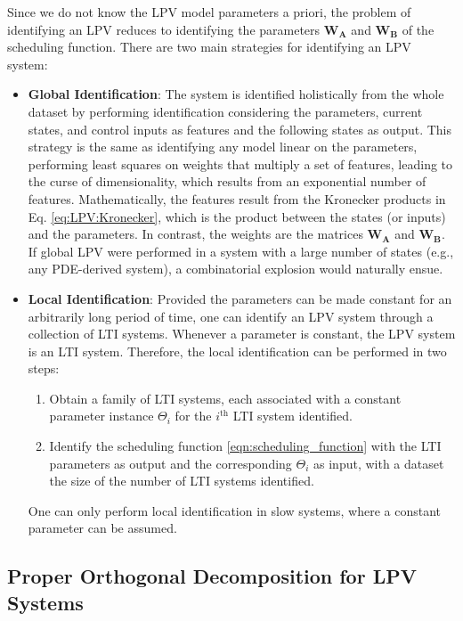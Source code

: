 Since we do not know the LPV model parameters a priori, the problem of identifying an LPV reduces to identifying the parameters $\mathbf{W_A}$ and $\mathbf{W_B}$ of the scheduling function.
%
There are two main strategies for identifying an LPV system:
\begin{itemize}
    \item \textbf{Global Identification}: The system is identified holistically from the whole dataset by performing identification considering the parameters, current states, and control inputs as features and the following states as output.
    This strategy is the same as identifying any model linear on the parameters, performing least squares on weights that multiply a set of features, leading to the curse of dimensionality, which results from an exponential number of features. Mathematically, the features result from the Kronecker products in Eq. \eqref{eq:LPV:Kronecker}, which is the product between the states (or inputs) and the parameters. In contrast, the weights are the matrices $\mathbf{W_A}$  and $\mathbf{W_B}$.
    If global LPV were performed in a system with a large number of states (e.g., any PDE-derived system), a combinatorial explosion would naturally ensue.
    
    \item \textbf{Local Identification}: Provided the parameters can be made constant for an arbitrarily long period of time, one can identify an LPV system through a collection of LTI systems.
    Whenever a parameter is constant, the LPV system is an LTI system.
    Therefore, the local identification can be performed in two steps:
    \begin{enumerate}
        \item Obtain a family of LTI systems, each associated with a constant parameter instance $\Theta_i$ for the $i^{\text{th}}$ LTI system identified.
        \item Identify the scheduling function \eqref{eqn:scheduling_function} with the LTI parameters as output and the corresponding $\Theta_i$ as input, with a dataset the size of the number of LTI systems identified.
    \end{enumerate}
    One can only perform local identification in slow systems, where a constant parameter can be assumed.
\end{itemize}


\subsection{Proper Orthogonal Decomposition for LPV Systems}  \label{sec:pod_lpv}

